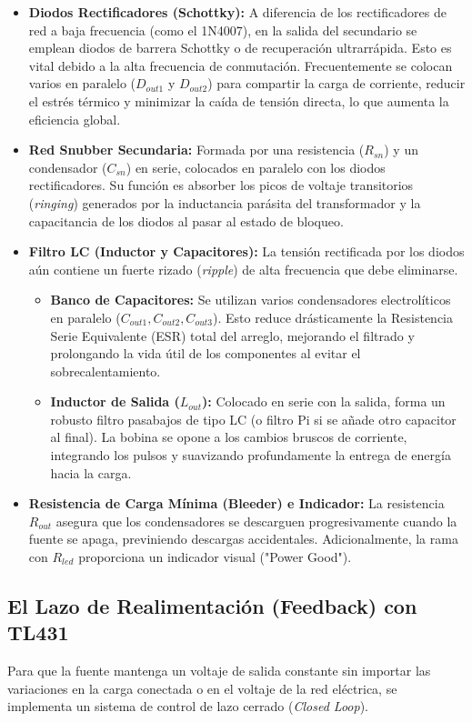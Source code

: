 \documentclass[12pt, a4paper]{article}
\begin{document}
\begin{itemize}[itemsep=1.5ex]
    \item \textbf{Diodos Rectificadores (Schottky):} A diferencia de los rectificadores de red a baja frecuencia (como el 1N4007), en la salida del secundario se emplean diodos de barrera Schottky o de recuperación ultrarrápida. Esto es vital debido a la alta frecuencia de conmutación. Frecuentemente se colocan varios en paralelo ($D_{out1}$ y $D_{out2}$) para compartir la carga de corriente, reducir el estrés térmico y minimizar la caída de tensión directa, lo que aumenta la eficiencia global.
    \item \textbf{Red Snubber Secundaria:} Formada por una resistencia ($R_{sn}$) y un condensador ($C_{sn}$) en serie, colocados en paralelo con los diodos rectificadores. Su función es absorber los picos de voltaje transitorios (\textit{ringing}) generados por la inductancia parásita del transformador y la capacitancia de los diodos al pasar al estado de bloqueo.
    \item \textbf{Filtro LC (Inductor y Capacitores):} La tensión rectificada por los diodos aún contiene un fuerte rizado (\textit{ripple}) de alta frecuencia que debe eliminarse.
    \begin{itemize}[itemsep=1ex, topsep=1ex]
        \item \textbf{Banco de Capacitores:} Se utilizan varios condensadores electrolíticos en paralelo ($C_{out1}, C_{out2}, C_{out3}$). Esto reduce drásticamente la Resistencia Serie Equivalente (ESR) total del arreglo, mejorando el filtrado y prolongando la vida útil de los componentes al evitar el sobrecalentamiento.
        \item \textbf{Inductor de Salida ($L_{out}$):} Colocado en serie con la salida, forma un robusto filtro pasabajos de tipo LC (o filtro Pi si se añade otro capacitor al final). La bobina se opone a los cambios bruscos de corriente, integrando los pulsos y suavizando profundamente la entrega de energía hacia la carga.
    \end{itemize}
    \item \textbf{Resistencia de Carga Mínima (Bleeder) e Indicador:} La resistencia $R_{out}$ asegura que los condensadores se descarguen progresivamente cuando la fuente se apaga, previniendo descargas accidentales. Adicionalmente, la rama con $R_{led}$ proporciona un indicador visual ("Power Good").
\end{itemize}

\subsection{El Lazo de Realimentación (Feedback) con TL431}
Para que la fuente mantenga un voltaje de salida constante sin importar las variaciones en la carga conectada o en el voltaje de la red eléctrica, se implementa un sistema de control de lazo cerrado (\textit{Closed Loop}). 
\end{document}
